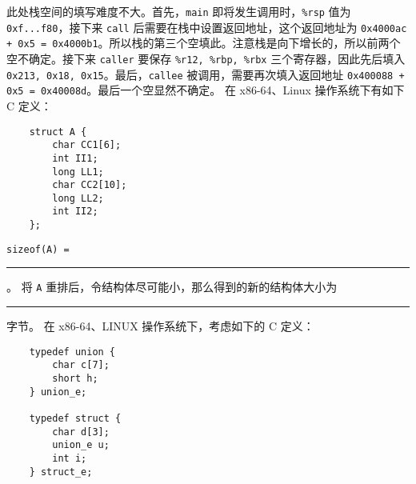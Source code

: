 \begin{problems}
        此处栈空间的填写难度不大。首先，\verb|main| 即将发生调用时，\verb|%rsp| 值为 \verb|0xf...f80|，接下来 \verb|call| 后需要在栈中设置返回地址，这个返回地址为 \verb|0x4000ac + 0x5 = 0x4000b1|。所以栈的第三个空填此。注意栈是向下增长的，所以前两个空不确定。接下来 \verb|caller| 要保存 \verb|%r12, %rbp, %rbx| 三个寄存器，因此先后填入 \verb|0x213, 0x18, 0x15|。最后，\verb|callee| 被调用，需要再次填入返回地址 \verb|0x400088 + 0x5 = 0x40008d|。最后一个空显然不确定。
        \pro 在 x86-64、Linux 操作系统下有如下 C 定义：
        \begin{verbatim}
    struct A {
        char CC1[6];
        int II1;
        long LL1;
        char CC2[10];
        long LL2;
        int II2;
    };
        \end{verbatim}
            \qn \verb|sizeof(A) = |\rule{2.5cm}{0.25mm}。
            \qn 将 \texttt{A} 重排后，令结构体尽可能小，那么得到的新的结构体大小为 \rule{2.5cm}{0.25mm} 字节。
        \pro 在 x86-64、LINUX 操作系统下，考虑如下的 C 定义：
        \begin{verbatim}
    typedef union {
        char c[7];
        short h;
    } union_e;

    typedef struct {
        char d[3];
        union_e u;
        int i;
    } struct_e;


\end{verbatim}
\end{problems}

